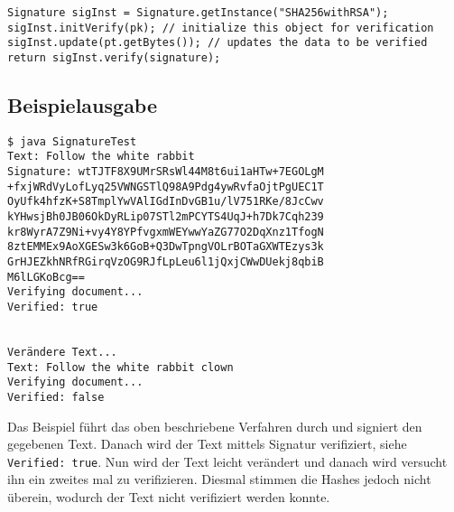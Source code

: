 \documentclass[12pt]{article}
\begin{document}
\begin{lstlisting}
Signature sigInst = Signature.getInstance("SHA256withRSA");
sigInst.initVerify(pk); // initialize this object for verification
sigInst.update(pt.getBytes()); // updates the data to be verified
return sigInst.verify(signature);
\end{lstlisting}

\subsection{Beispielausgabe}

\begin{lstlisting}
$ java SignatureTest 
Text: Follow the white rabbit
Signature: wtTJTF8X9UMrSRsWl44M8t6ui1aHTw+7EGOLgM
+fxjWRdVyLofLyq25VWNGSTlQ98A9Pdg4ywRvfaOjtPgUEC1T
OyUfk4hfzK+S8TmplYwVAlIGdInDvGB1u/lV751RKe/8JcCwv
kYHwsjBh0JB06OkDyRLip07STl2mPCYTS4UqJ+h7Dk7Cqh239
kr8WyrA7Z9Ni+vy4Y8YPfvgxmWEYwwYaZG77O2DqXnz1TfogN
8ztEMMEx9AoXGESw3k6GoB+Q3DwTpngVOLrBOTaGXWTEzys3k
GrHJEZkhNRfRGirqVzOG9RJfLpLeu6l1jQxjCWwDUekj8qbiB
M6lLGKoBcg==
Verifying document...
Verified: true


Verändere Text...
Text: Follow the white rabbit clown
Verifying document...
Verified: false
\end{lstlisting}
Das Beispiel führt das oben beschriebene Verfahren durch und signiert den
gegebenen Text. Danach wird der Text mittels Signatur verifiziert, siehe
\texttt{Verified: true}. Nun wird der Text leicht verändert und danach wird
versucht ihn ein zweites mal zu verifizieren. Diesmal stimmen die Hashes jedoch
nicht überein, wodurch der Text nicht verifiziert werden konnte.
\end{document}
